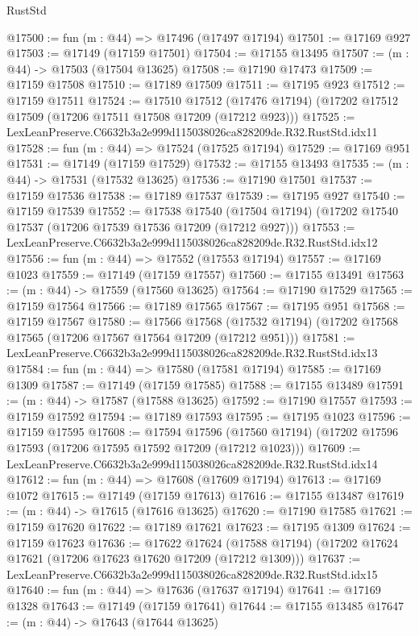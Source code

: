 \begin{lexlean}{RustStd}
\begin{coremodule}
@17500 := fun (m : @44) => @17496 (@17497 @17194)
@17501 := @17169 @927
@17503 := @17149 (@17159 @17501)
@17504 := @17155 @13495
@17507 := (m : @44) -> @17503 (@17504 @13625)
@17508 := @17190 @17473
@17509 := @17159 @17508
@17510 := @17189 @17509
@17511 := @17195 @923
@17512 := @17159 @17511
@17524 := @17510
    @17512
    (@17476 @17194)
    (@17202 @17512 @17509 (@17206 @17511 @17508 @17209 (@17212 @923)))
@17525 := LexLeanPreserve.C6632b3a2e999d115038026ca828209de.R32.RustStd.idx11
@17528 := fun (m : @44) => @17524 (@17525 @17194)
@17529 := @17169 @951
@17531 := @17149 (@17159 @17529)
@17532 := @17155 @13493
@17535 := (m : @44) -> @17531 (@17532 @13625)
@17536 := @17190 @17501
@17537 := @17159 @17536
@17538 := @17189 @17537
@17539 := @17195 @927
@17540 := @17159 @17539
@17552 := @17538
    @17540
    (@17504 @17194)
    (@17202 @17540 @17537 (@17206 @17539 @17536 @17209 (@17212 @927)))
@17553 := LexLeanPreserve.C6632b3a2e999d115038026ca828209de.R32.RustStd.idx12
@17556 := fun (m : @44) => @17552 (@17553 @17194)
@17557 := @17169 @1023
@17559 := @17149 (@17159 @17557)
@17560 := @17155 @13491
@17563 := (m : @44) -> @17559 (@17560 @13625)
@17564 := @17190 @17529
@17565 := @17159 @17564
@17566 := @17189 @17565
@17567 := @17195 @951
@17568 := @17159 @17567
@17580 := @17566
    @17568
    (@17532 @17194)
    (@17202 @17568 @17565 (@17206 @17567 @17564 @17209 (@17212 @951)))
@17581 := LexLeanPreserve.C6632b3a2e999d115038026ca828209de.R32.RustStd.idx13
@17584 := fun (m : @44) => @17580 (@17581 @17194)
@17585 := @17169 @1309
@17587 := @17149 (@17159 @17585)
@17588 := @17155 @13489
@17591 := (m : @44) -> @17587 (@17588 @13625)
@17592 := @17190 @17557
@17593 := @17159 @17592
@17594 := @17189 @17593
@17595 := @17195 @1023
@17596 := @17159 @17595
@17608 := @17594
    @17596
    (@17560 @17194)
    (@17202 @17596 @17593 (@17206 @17595 @17592 @17209 (@17212 @1023)))
@17609 := LexLeanPreserve.C6632b3a2e999d115038026ca828209de.R32.RustStd.idx14
@17612 := fun (m : @44) => @17608 (@17609 @17194)
@17613 := @17169 @1072
@17615 := @17149 (@17159 @17613)
@17616 := @17155 @13487
@17619 := (m : @44) -> @17615 (@17616 @13625)
@17620 := @17190 @17585
@17621 := @17159 @17620
@17622 := @17189 @17621
@17623 := @17195 @1309
@17624 := @17159 @17623
@17636 := @17622
    @17624
    (@17588 @17194)
    (@17202 @17624 @17621 (@17206 @17623 @17620 @17209 (@17212 @1309)))
@17637 := LexLeanPreserve.C6632b3a2e999d115038026ca828209de.R32.RustStd.idx15
@17640 := fun (m : @44) => @17636 (@17637 @17194)
@17641 := @17169 @1328
@17643 := @17149 (@17159 @17641)
@17644 := @17155 @13485
@17647 := (m : @44) -> @17643 (@17644 @13625)

\end{coremodule}
\end{lexlean}
